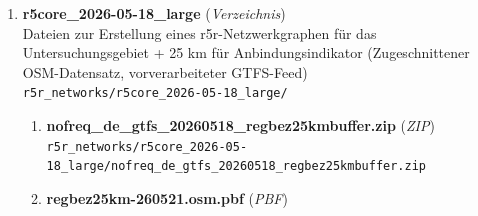\begin{enumerate}[label=A\arabic*, ref=A\arabic*, leftmargin=*, itemsep=0.5em, topsep=0.3em]
\begin{enumerate}[label=A\arabic{enumi}-\arabic*, ref=A\arabic{enumi}-\arabic*, leftmargin=*, itemsep=0.5em, topsep=0.3em]
Dateien zur Erstellung eines r5r-Netzwerkgraphen für das Untersuchungsgebiet (Zugeschnittener OSM-Datensatz, vorverarbeiteter GTFS-Feed)\\
\texttt{\small r5r\_networks/r5core\_2026-05-18/}
\edef\appendixlabelkey{app:A\arabic{enumi}-\arabic{enumii}}
\expandafter\label\expandafter{\appendixlabelkey}
\begin{enumerate}[label=A\arabic{enumi}-\arabic{enumii}-\arabic*, ref=A\arabic{enumi}-\arabic{enumii}-\arabic*, leftmargin=*, itemsep=0.5em, topsep=0.3em]
\item \textbf{nofreq\_de\_gtfs\_20260518\_regbez.zip} \textnormal{(\textit{ZIP})}\\
\texttt{\small r5r\_networks/r5core\_2026-05-18/nofreq\_de\_gtfs\_20260518\_regbez.zip}
\edef\appendixlabelkey{app:A\arabic{enumi}-\arabic{enumii}-\arabic{enumiii}}
\expandafter\label\expandafter{\appendixlabelkey}
\item \textbf{regbez10km-260521.osm.pbf} \textnormal{(\textit{PBF})}\\
\texttt{\small r5r\_networks/r5core\_2026-05-18/regbez10km-260521.osm.pbf}
\edef\appendixlabelkey{app:A\arabic{enumi}-\arabic{enumii}-\arabic{enumiii}}
\expandafter\label\expandafter{\appendixlabelkey}
\end{enumerate}
\item \textbf{r5core\_2026-05-18\_large} \textnormal{(\textit{Verzeichnis})}\\
Dateien zur Erstellung eines r5r-Netzwerkgraphen für das Untersuchungsgebiet + 25 km für Anbindungsindikator (Zugeschnittener OSM-Datensatz, vorverarbeiteter GTFS-Feed)\\
\texttt{\small r5r\_networks/r5core\_2026-05-18\_large/}
\edef\appendixlabelkey{app:A\arabic{enumi}-\arabic{enumii}}
\expandafter\label\expandafter{\appendixlabelkey}
\begin{enumerate}[label=A\arabic{enumi}-\arabic{enumii}-\arabic*, ref=A\arabic{enumi}-\arabic{enumii}-\arabic*, leftmargin=*, itemsep=0.5em, topsep=0.3em]
\item \textbf{nofreq\_de\_gtfs\_20260518\_regbez25kmbuffer.zip} \textnormal{(\textit{ZIP})}\\
\texttt{\small r5r\_networks/r5core\_2026-05-18\_large/nofreq\_de\_gtfs\_20260518\_regbez25kmbuffer.zip}
\edef\appendixlabelkey{app:A\arabic{enumi}-\arabic{enumii}-\arabic{enumiii}}
\expandafter\label\expandafter{\appendixlabelkey}
\item \textbf{regbez25km-260521.osm.pbf} \textnormal{(\textit{PBF})}\\

\end{enumerate}
\end{enumerate}
\end{enumerate}
